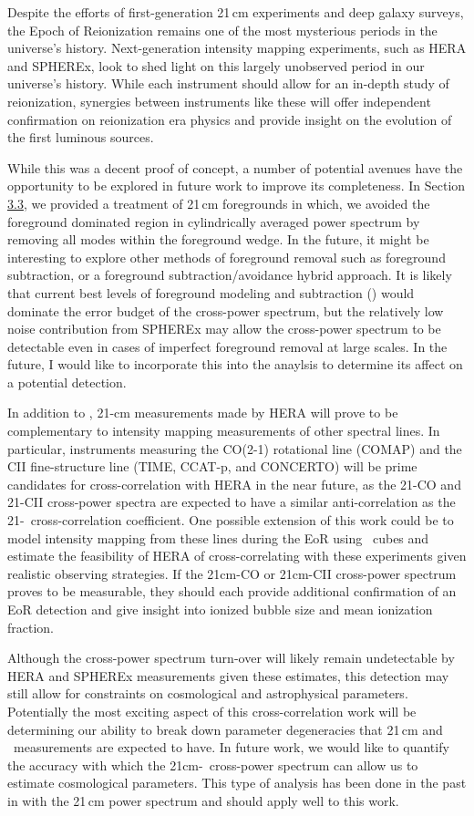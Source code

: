 Despite the efforts of first-generation 21\,cm experiments and deep galaxy surveys, the Epoch of Reionization
remains one of the most mysterious periods in the universe's history. Next-generation
intensity mapping experiments, such as HERA and SPHEREx, look to shed light on
this largely unobserved period in our universe's history. While each instrument should allow for an in-depth study
of reionization, synergies between instruments like these will offer independent
confirmation on reionization era physics and provide insight on the evolution of
the first luminous sources.

While this was a decent proof of concept, a number of potential avenues have the
opportunity to be explored in future work to improve its completeness. In Section \hyperref[sec:foregrounds]{3.3}, we provided a treatment
of 21\,cm foregrounds in which, we avoided the foreground dominated region in
cylindrically averaged power spectrum by removing all modes within the foreground
wedge. In the future, it might be interesting to explore other methods of foreground
removal such as foreground subtraction, or a foreground subtraction/avoidance hybrid approach.
It is likely that current best levels of foreground modeling and subtraction
(\cite{2019ApJ...884....1B}) would dominate the error
budget of the cross-power spectrum, but the relatively low noise contribution from SPHEREx
may allow the cross-power spectrum to be detectable even in cases of imperfect foreground
removal at large scales. In the future, I would like to incorporate this into the
anaylsis to determine its affect on a potential detection.

In addition to \lya, 21-cm measurements made by HERA will prove to be
complementary to intensity mapping measurements of other spectral lines. In particular,
instruments measuring the CO(2-1) rotational line (COMAP) and the CII fine-structure
line (TIME, CCAT-p, and CONCERTO) will be prime candidates for cross-correlation
with HERA in the near future, as the 21-CO and 21-CII cross-power spectra are expected to
have a similar anti-correlation as the 21-\lya\ cross-correlation coefficient. One possible extension of this work could be to model
intensity mapping from these lines during the EoR using \fastsim\ cubes and estimate the feasibility of HERA
of cross-correlating with these experiments given realistic observing strategies. If the 21cm-CO or 21cm-CII cross-power
spectrum proves to be measurable, they should each provide additional confirmation
of an EoR detection and give insight into ionized bubble size and mean ionization fraction.

Although the cross-power spectrum turn-over will likely remain undetectable
by HERA and SPHEREx measurements given these estimates, this
detection may still allow for constraints on cosmological and astrophysical parameters.
Potentially the most exciting aspect of this cross-correlation work will
be determining our ability to break down parameter degeneracies that
21\,cm and \lya\ measurements are expected to have. In future work, we would like to quantify
the accuracy with which the 21cm-\lya\ cross-power spectrum can allow us to estimate
cosmological parameters. This type of analysis has been done in the past in \cite{2014ApJ...782...66P}
with the 21\,cm power spectrum and should apply well to this work.
